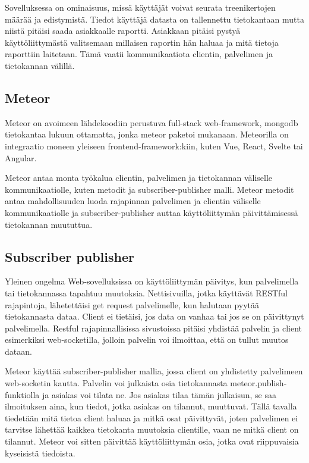 


Sovelluksessa on ominaisuus, missä käyttäjät voivat seurata treenikertojen määrää ja edistymistä.
Tiedot käyttäjä datasta on tallennettu tietokantaan mutta niistä pitäisi saada asiakkaalle raportti.
Asiakkaan pitäisi pystyä käyttöliittymästä valitsemaan millaisen raportin hän haluaa ja mitä tietoja raporttiin laitetaan.
Tämä vaatii kommunikaatiota clientin, palvelimen ja tietokannan välillä. 
\medskip

\subsection*{Meteor}


Meteor on avoimeen lähdekoodiin perustuva full-stack web-framework, mongodb tietokantaa lukuun ottamatta, jonka meteor paketoi mukanaan.
Meteorilla on integraatio moneen yleiseen frontend-framework:kiin, kuten Vue, React, Svelte tai Angular.
\medskip




Meteor antaa monta työkalua clientin, palvelimen ja tietokannan väliselle kommunikaatiolle, kuten metodit ja subscriber-publisher malli.
Meteor metodit antaa mahdollisuuden luoda rajapinnan palvelimen ja clientin väliselle kommunikaatiolle ja 
subscriber-publisher auttaa käyttöliittymän päivittämisessä tietokannan muututtua.





\medskip







\subsection*{Subscriber publisher}

Yleinen ongelma Web-sovelluksissa on käyttöliittymän päivitys, kun palvelimella tai tietokannassa tapahtuu muutoksia. 
Nettisivuilla, jotka käyttävät RESTful rajapintoja, lähetettäisi get request palvelimelle, kun halutaan pyytää tietokannasta dataa. Client ei tietäisi, jos data on vanhaa tai jos se on päivittynyt palvelimella.
Restful rajapinnallisissa sivustoissa pitäisi yhdistää palvelin ja client esimerkiksi web-socketilla, jolloin palvelin voi ilmoittaa, että on tullut muutos dataan.

\medskip

Meteor käyttää subscriber-publisher mallia, jossa client on yhdistetty palvelimeen web-socketin kautta. 
%
Palvelin voi julkaista osia tietokannasta meteor.publish-funktiolla ja asiakas voi tilata ne. Jos asiakas tilaa tämän julkaisun, se saa ilmoituksen aina, kun tiedot, jotka asiakas on tilannut, muuttuvat.
Tällä tavalla tiedetään mitä tietoa client haluaa ja mitkä osat päivittyvät, joten palvelimen ei tarvitse lähettää kaikkea tietokanta muutoksia clientille, vaan ne mitkä client on tilannut.
Meteor voi sitten päivittää käyttöliittymän osia, jotka ovat riippuvaisia kyseisistä tiedoista. 



